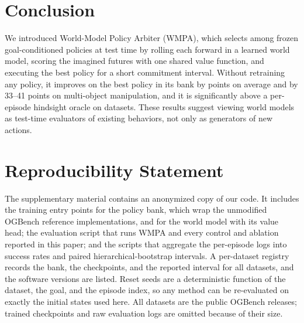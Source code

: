 \documentclass{article}
\theoremstyle{plain}
\theoremstyle{definition}
\theoremstyle{plain}
\newcommand{\wmpa}{\textsc{WMPA}}
\begin{document}
\section{Conclusion}
\label{sec:conclusion}

We introduced World-Model Policy Arbiter (\wmpa{}), which selects among frozen goal-conditioned policies at test time by rolling each forward in a learned world model, scoring the imagined futures with one shared value function, and executing the best policy for a short commitment interval. Without retraining any policy, it improves on the best policy in its bank by \MeanGain{} points on average and by 33--41 points on multi-object manipulation, and it is significantly above a per-episode hindsight oracle on \NumAboveUnionSig{} datasets. These results suggest viewing world models as test-time evaluators of existing behaviors, not only as generators of new actions.

\label{page:endconclusion}
\section*{Reproducibility Statement}
The supplementary material contains an anonymized copy of our code. It includes the training entry points for the policy bank, which wrap the unmodified OGBench reference implementations, and for the world model with its value head; the evaluation script that runs \wmpa{} and every control and ablation reported in this paper; and the scripts that aggregate the per-episode logs into success rates and paired hierarchical-bootstrap intervals. A per-dataset registry records the bank, the checkpoints, and the reported interval for all \NumEnvs{} datasets, and the software versions are listed. Reset seeds are a deterministic function of the dataset, the goal, and the episode index, so any method can be re-evaluated on exactly the initial states used here. All datasets are the public OGBench releases; trained checkpoints and raw evaluation logs are omitted because of their size. 
\end{document}
